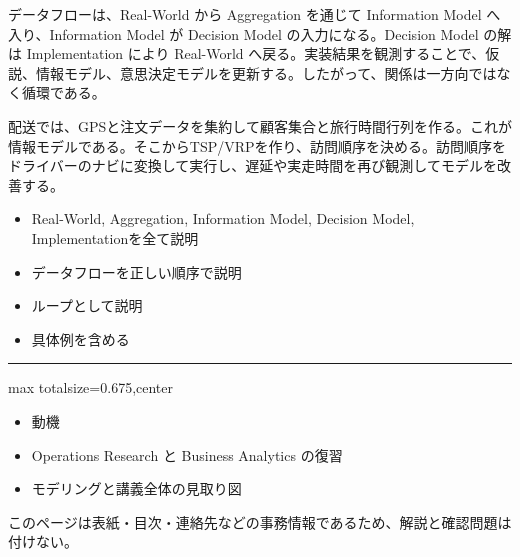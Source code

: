 データフローは、Real-World から Aggregation を通じて Information Model へ入り、Information Model が Decision Model の入力になる。Decision Model の解は Implementation により Real-World へ戻る。実装結果を観測することで、仮説、情報モデル、意思決定モデルを更新する。したがって、関係は一方向ではなく循環である。\par
{}
配送では、GPSと注文データを集約して顧客集合と旅行時間行列を作る。これが情報モデルである。そこからTSP/VRPを作り、訪問順序を決める。訪問順序をドライバーのナビに変換して実行し、遅延や実走時間を再び観測してモデルを改善する。\par
{}
\begin{itemize}
\item Real-World, Aggregation, Information Model, Decision Model, Implementationを全て説明
\item データフローを正しい順序で説明
\item ループとして説明
\item 具体例を含める
\end{itemize}
\vspace{2mm}\hrule\vspace{2mm}

\clearpage
{}
\begin{adjustbox}{max totalsize={\textwidth}{0.675\textheight},center}
\begin{minipage}{\textwidth}\scriptsize
\begin{minipage}[t]{0.485\textwidth}
\begin{itemize}
\item 動機
\item Operations Research と Business Analytics の復習
\item モデリングと講義全体の見取り図
\end{itemize}
\end{minipage}\hfill
\begin{minipage}[t]{0.485\textwidth}
{\small このページは表紙・目次・連絡先などの事務情報であるため、解説と確認問題は付けない。}
\end{minipage}
\end{minipage}
\end{adjustbox}

